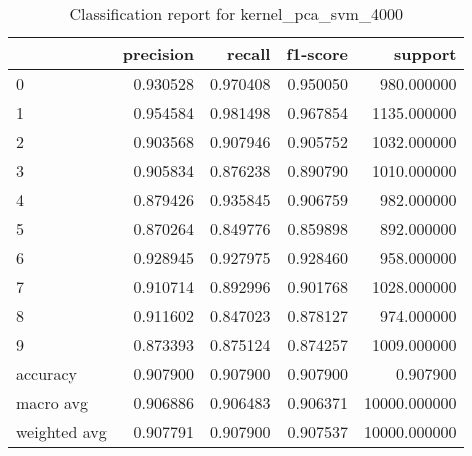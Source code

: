 \begin{table}[htb!]
\centering
\caption{Classification report for kernel_pca_svm_4000}
\label{tab:classification-report-kernel_pca_svm_4000}
\begin{tabular}{lrrrr}
\toprule
 & precision & recall & f1-score & support \\
\midrule
0 & 0.930528 & 0.970408 & 0.950050 & 980.000000 \\
1 & 0.954584 & 0.981498 & 0.967854 & 1135.000000 \\
2 & 0.903568 & 0.907946 & 0.905752 & 1032.000000 \\
3 & 0.905834 & 0.876238 & 0.890790 & 1010.000000 \\
4 & 0.879426 & 0.935845 & 0.906759 & 982.000000 \\
5 & 0.870264 & 0.849776 & 0.859898 & 892.000000 \\
6 & 0.928945 & 0.927975 & 0.928460 & 958.000000 \\
7 & 0.910714 & 0.892996 & 0.901768 & 1028.000000 \\
8 & 0.911602 & 0.847023 & 0.878127 & 974.000000 \\
9 & 0.873393 & 0.875124 & 0.874257 & 1009.000000 \\
accuracy & 0.907900 & 0.907900 & 0.907900 & 0.907900 \\
macro avg & 0.906886 & 0.906483 & 0.906371 & 10000.000000 \\
weighted avg & 0.907791 & 0.907900 & 0.907537 & 10000.000000 \\
\bottomrule
\end{tabular}
\end{table}
